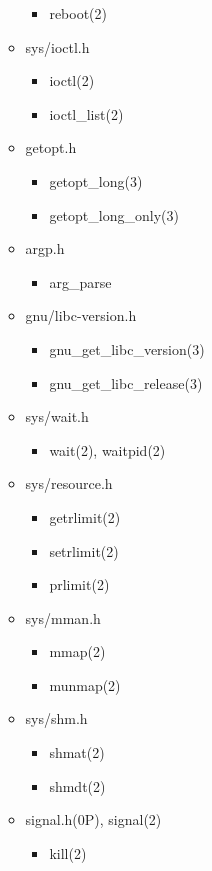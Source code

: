 \documentclass{article}
\begin{document}
\begin{itemize}
\begin{itemize}
\begin{itemize}
                    \item reboot(2)
                \end{itemize}
            \item sys/ioctl.h
                \begin{itemize}
                    \item ioctl(2)
                    \item ioctl_list(2)
                \end{itemize}
            \item getopt.h
                \begin{itemize}
                    \item getopt_long(3)
                    \item getopt_long_only(3)
                \end{itemize}
            \item argp.h
                \begin{itemize}
                    \item arg_parse
                \end{itemize}
            \item gnu/libc-version.h
                \begin{itemize}
                    \item gnu_get_libc_version(3)
                    \item gnu_get_libc_release(3)
                \end{itemize}
            \item sys/wait.h
                \begin{itemize}
                    \item wait(2), waitpid(2)
                \end{itemize}
            \item sys/resource.h
                \begin{itemize}
                    \item getrlimit(2)
                    \item setrlimit(2)
                    \item prlimit(2)
                \end{itemize}
            \item sys/mman.h
                \begin{itemize}
                    \item mmap(2)
                    \item munmap(2)
                \end{itemize}
            \item sys/shm.h
                \begin{itemize}
                    \item shmat(2)
                    \item shmdt(2)
                \end{itemize}
            \item signal.h(0P), signal(2)
                \begin{itemize}
                    \item kill(2)


\end{itemize}
\end{itemize}
\end{itemize}
\end{document}
